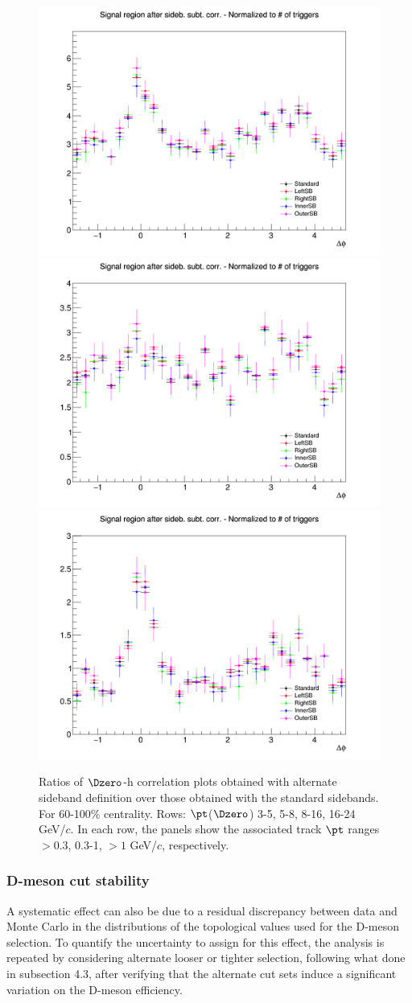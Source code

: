 \begin{figure}
{\includegraphics[width=0.31\linewidth]{figuresVsCent/Dzero/SystSideb/60100/AzimCorrDistr_Dzero_Canvas_PtIntBins9to11_PoolInt_thr03to99_Superimp.png}}
{\includegraphics[width=0.31\linewidth]{figuresVsCent/Dzero/SystSideb/60100/AzimCorrDistr_Dzero_Canvas_PtIntBins9to11_PoolInt_thr03to1_Superimp.png}}
{\includegraphics[width=0.31\linewidth]{figuresVsCent/Dzero/SystSideb/60100/AzimCorrDistr_Dzero_Canvas_PtIntBins9to11_PoolInt_thr1to99_Superimp.png}}  \\
 \caption{Ratios of $\Dzero$-h correlation plots obtained with alternate sideband definition over those obtained with the standard sidebands. For 60-100\% centrality. Rows: $\pt$($\Dzero$) 3-5, 5-8, 8-16, 16-24 GeV/$c$. In each row, the panels show the associated track $\pt$ ranges $> 0.3$, 0.3-1, $> 1$ GeV/$c$, respectively.}
\label{fig:SysBkg60100}
\end{figure}

\subsubsection{D-meson cut stability}
A systematic effect can also be due to a residual discrepancy between data and Monte Carlo in the distributions of the topological values used for the D-meson selection. To quantify the uncertainty to assign for this effect, the analysis is repeated by considering alternate looser or tighter selection, following what done in subsection 4.3, after verifying that the alternate cut sets induce a significant variation on the D-meson efficiency.


